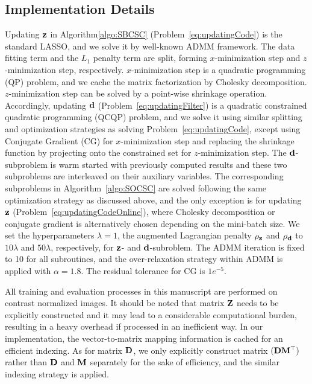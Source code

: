 \subsection{Implementation Details}
Updating $\code$ in Algorithm\ref{algo:SBCSC} (Problem~\ref{eq:updatingCode}) is the standard LASSO, and we solve it by well-known ADMM framework. The data fitting term and the $L_1$ penalty term are split, forming $x$-minimization step and $z$-minimization step, respectively. $x$-minimization step is a quadratic programming (QP) problem, and we cache the matrix factorization by Cholesky decomposition. $z$-minimization step can be solved by a point-wise shrinkage operation. Accordingly, updating $\filter$ (Problem~\ref{eq:updatingFilter}) is a quadratic constrained quadratic programming (QCQP) problem, and we solve it using similar splitting and optimization strategies as solving Problem~\ref{eq:updatingCode}, except using Conjugate Gradient (CG) for $x$-minimization step and replacing the shrinkage function by projecting onto the constrained set for $z$-minimization step. The $\filter$-subproblem is warm started with previously computed results and these two subproblems are interleaved on their auxiliary variables. The corresponding subproblems in Algorithm~\ref{algo:SOCSC} are solved following the same optimization strategy as discussed above, and the only exception is for updating $\code$ (Problem~\ref{eq:updatingCodeOnline}), where Cholesky decomposition or conjugate gradient is alternatively chosen depending on the mini-batch size. We set the hyperparameters $\lambda=1$,  the augmented Lagrangian penalty $\rho_{\code}$ and $\rho_{\filter}$ to $10 \lambda$ and $50 \lambda$, respectively, for $\code$- and $\filter$-subroblem. The ADMM iteration is fixed to 10 for all subroutines, and the over-relaxation strategy within ADMM is applied with $\alpha = 1.8$. The residual tolerance for CG is $1e^{-5}$.

All training and evaluation processes in this manuscript are performed on contrast normalized images. %
It should be noted that matrix $\Code$ needs to be explicitly constructed and it may lead to a considerable computational burden, resulting in a heavy overhead if processed in an inefficient way. In our implementation, the vector-to-matrix mapping information is cached for an efficient indexing. As for matrix $\Filter$, we only explicitly construct matrix $(\Filter \mask^\top)$ rather than $\Filter$ and $\mask$ separately for the sake of efficiency, and the similar indexing strategy is applied.